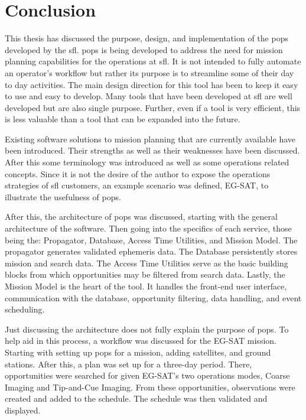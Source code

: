 \glsresetall{} 

\chapter{Conclusion}\label{chap:conclusion}


This thesis has discussed the purpose, design, and implementation of the
\gls{pops} developed by the \gls{sfl}. \gls{pops} is being developed to address
the need for mission planning capabilities for the operations at \gls{sfl}. It
is not intended to fully automate an operator's workflow but rather its purpose
is to streamline some of their day to day activities. The main design direction
for this tool has been to keep it easy to use and easy to develop. Many tools
that have been developed at \gls{sfl} are well developed but are also single
purpose. Further, even if a tool is very efficient, this is less valuable than
a tool that can be expanded into the future. 

Existing software solutions to mission planning that are currently available
have been introduced. Their strengths as well as their weaknesses have been
discussed. After this some terminology was introduced as well as some
operations related concepts. Since it is not the desire of the author to expose
the operations strategies of \gls{sfl} customers, an example scenario was
defined, EG-SAT, to illustrate the usefulness of \gls{pops}.

After this, the architecture of \gls{pops} was discussed, starting with the
general architecture of the software. Then going into the specifics of each
service, those being the: Propagator, Database, Access Time Utilities, and
Mission Model. The propagator generates validated ephemeris data. The Database
persistently stores mission and search data. The Access Time Utilities serve as
the basic building blocks from which opportunities may be filtered from search
data. Lastly, the Mission Model is the heart of the tool.  It handles the
front-end user interface, communication with the database, opportunity
filtering, data handling, and event scheduling.

Just discussing the architecture does not fully explain the purpose of
\gls{pops}. To help aid in this process, a workflow was discussed for the
EG-SAT mission. Starting with setting up \gls{pops} for a mission, adding
satellites, and ground stations. After this, a plan was set up for a three-day
period. There, opportunities were searched for given EG-SAT's two operations
modes, Coarse Imaging and Tip-and-Cue Imaging. From these opportunities,
observations were created and added to the schedule. The schedule was then
validated and displayed.  

